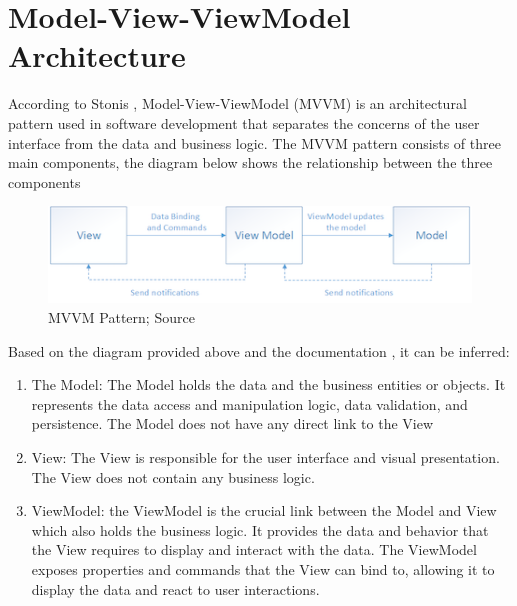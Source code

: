 \section{Model-View-ViewModel Architecture}
According to Stonis \autocite{stonis2022mvvm}, Model-View-ViewModel (MVVM) is an architectural pattern used in software development that separates the concerns of the user interface from the data and business logic. 
The MVVM pattern consists of three main components, the diagram below shows the relationship between the three components

\begin{figure}[H]
    \centering
    \includegraphics{images/mvvm-pattern.png}
    \caption{MVVM Pattern; Source \autocite{stonis2022mvvm}}
\end{figure}

Based on the diagram provided above and the documentation \autocite{stonis2022mvvm}, it can be inferred:
\begin{enumerate}
    \item The Model:\newline
    The Model holds the data and the business entities or objects. It represents the data access and manipulation logic, data validation, and persistence. The Model does not have any direct link to the View
    \item View: \newline
    The View is responsible for the user interface and visual presentation. The View does not contain any business logic.
    \item ViewModel: \newline
    the ViewModel is the crucial link between the Model and View which also holds the business logic. It provides the data and behavior that the View requires to display and interact with the data. The ViewModel exposes properties and commands that the View can bind to, allowing it to display the data and react to user interactions. 
\end{enumerate}


